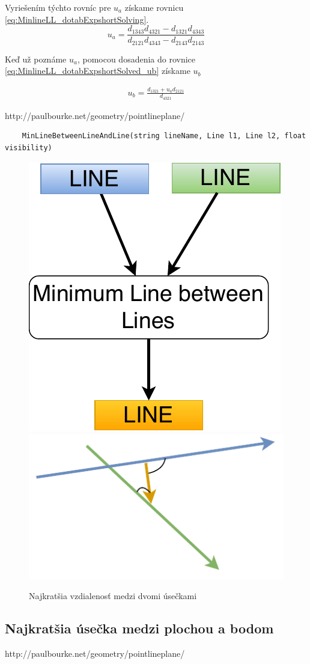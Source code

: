 Vyriešením týchto rovníc pre $u_a$ získame rovnicu \ref{eq:MinlineLL_dotabExpshortSolving}.
\begin{equation}
 u_a= \frac
 {d_{1343} d_{4321} - d_{1321} d_{4343} }
 {d_{2121} d_{4343} - d_{2143} d_{2143} }
    \label{eq:MinlineLL_dotabExpshortSolving}
\end{equation}

Keď už poznáme $u_a$, pomocou dosadenia do rovnice \ref{eq:MinlineLL_dotabExpshortSolved_ub} získame $u_b$ 

\begin{equation}
\begin{aligned}
u_b  = \frac{d_{1321} + u_a d_{2121}}{d_{4321}}
\end{aligned}
    \label{eq:MinlineLL_dotabExpshortSolved_ub}
\end{equation}


http://paulbourke.net/geometry/pointlineplane/
\begin{lstlisting}
	MinLineBetweenLineAndLine(string lineName, Line l1, Line l2, float visibility)
\end{lstlisting}

\begin{figure}[H]
	\centering
	\includegraphics[height=0.3\textwidth]{obrazky-figures/Diagram/Line/DP Navrh operacii-1D - LineMinLL.pdf}
	\includegraphics[height=0.3\textwidth]{obrazky-figures/Diagram/Draw/2Line/DP Navrh operacii-1D - LineMinLL.pdf}
	\caption{Najkratšia vzdialenosť medzi dvomi úsečkami}
	\label{fig:1}
\end{figure}


\subsection{Najkratšia úsečka medzi plochou a bodom}
http://paulbourke.net/geometry/pointlineplane/


